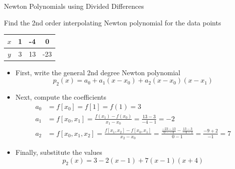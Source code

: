 \documentclass[10pt]{beamer}
\begin{document}
\begin{frame}[shrink]{Newton Polynomials using Divided Differences}
\begin{example}
  Find the 2nd order interpolating Newton polynomial for the data points 
  \begin{center}
    \begin{tabular}{c | c c c}
      $x$ & 1 & -4 & 0\\\hline
      $y$ & 3 & 13 & -23\\
    \end{tabular}
  \end{center}
\end{example}
\begin{itemize}
    \item[1.] First, write the general 2nd degree Newton polynomial
\begin{equation*}
  p_2(x) = a_0  + a_1(x-x_0) + a_2(x-x_0)(x-x_1)
\end{equation*}
\item[2.] Next, compute the coefficients
\begin{align*}
  a_0 & = f[x_0] = f[1] = f(1) = 3\\
  a_1 & = f[x_0,x_1] = \frac{f(x_1)-f(x_0)}{x_1 - x_0} = \frac{13-3}{-4-1} =
  -2\\
  a_2 & = f[x_0,x_1,x_2] = \frac{f[x_1,x_2]-f[x_0,x_1]}{x_2-x_0} = \frac{\frac{-23-13}{0--4} - \frac{13-3}{-4-1}}{0-1} = \frac{-9+2}{-1} = 7
\end{align*}
\item[3.] Finally, substitute the values
\begin{equation*}
  p_2(x) = 3 -2(x-1) + 7(x-1)(x+4)
\end{equation*}
\end{itemize}
\end{frame}
\end{document}
